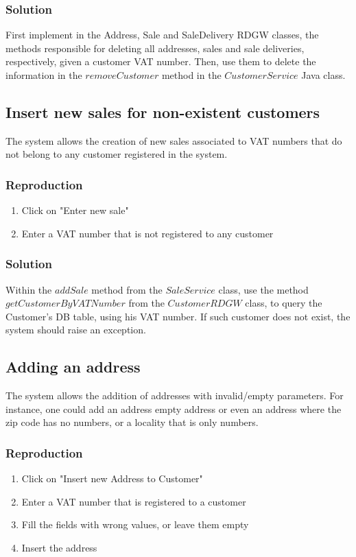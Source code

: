 \documentclass[12pt]{article}
\begin{document}
\subsubsection{Solution}
First implement in the Address, Sale and SaleDelivery RDGW classes, the methods responsible for deleting all addresses, sales and sale deliveries, respectively, given a customer VAT number. Then, use them to delete the information in the $removeCustomer$ method in the $CustomerService$ Java class.
\newpage
\subsection{Insert new sales for non-existent customers}
The system allows the creation of new sales associated to VAT numbers that do not belong to any customer registered in the system.

\subsubsection{Reproduction}
\begin{enumerate}
   \item  Click on "Enter new sale"
   
   \item  Enter a VAT number that is not registered to any customer
\end{enumerate}


\subsubsection{Solution}
Within the $addSale$ method from the $SaleService$ class, use the method $getCustomerByVATNumber$ from the $CustomerRDGW$ class, to query the Customer's DB table, using his VAT number. If such customer does not exist, the system should raise an exception.

\subsection{Adding an address}
The system allows the addition of addresses with invalid/empty parameters. For instance, one could add an address empty address or even an address where the zip code has no numbers, or a locality that is only numbers.

\subsubsection{Reproduction}
\begin{enumerate}
   \item  Click on "Insert new Address to Customer"
   
   \item  Enter a VAT number that is registered to a customer
   
   \item  Fill the fields with wrong values, or leave them empty
   
   \item  Insert the address
\end{enumerate}
\end{document}
